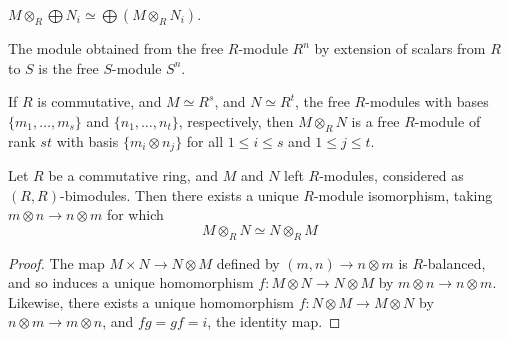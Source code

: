 \begin{corollary}
    $M \otimes_R \bigoplus{N_i} \simeq \bigoplus{(M \otimes_R N_i)}$.
\end{corollary}
\begin{corollary}
    The module obtained from the free $R$-module $R^n$ by extension of scalars
    from $R$ to $S$ is the free  $S$-module  $S^n$.
\end{corollary}
\begin{corollary}
    If $R$ is commutative, and  $M \simeq R^s$, and  $N \simeq R^t$, the free
    $R$-modules with bases $\{m_1, \dots, m_s\}$ and $\{n_1, \dots, n_t\}$,
    respectively, then $M \otimes_R N$ is a free  $R$-module of rank  $st$ with
    basis  $\{m_i \otimes n_j\}$ for all $1 \leq i \leq s$ and  $1 \leq j \leq
    t$.
\end{corollary}

\begin{lemma}\label{4.4.12}
    Let $R$ be a commutative ring, and  $M$ and  $N$ left  $R$-modules,
    considered as $(R,R)$-bimodules. Then there exists a unique $R$-module
    isomorphism, taking  $m \otimes n \xrightarrow{} n \otimes m$ for which
    \begin{equation*}
        M \otimes_R N \simeq N \otimes_R M
    \end{equation*}
\end{lemma}
\begin{proof}
    The map $M \times N \xrightarrow{} N \otimes M$ defined by $(m,n)
    \xrightarrow{} n \otimes m$ is $R$-balanced, and so induces a unique
    homomorphism $f:M \otimes N \xrightarrow{} N \otimes M$ by $m \otimes n
    \xrightarrow{} n \otimes m$. Likewise, there exists a unique homomorphism
    $f:N \otimes M \xrightarrow{} M \otimes N$ by $n \otimes m \xrightarrow{} m
    \otimes n$, and $fg=gf=i$, the identity map.
\end{proof}

